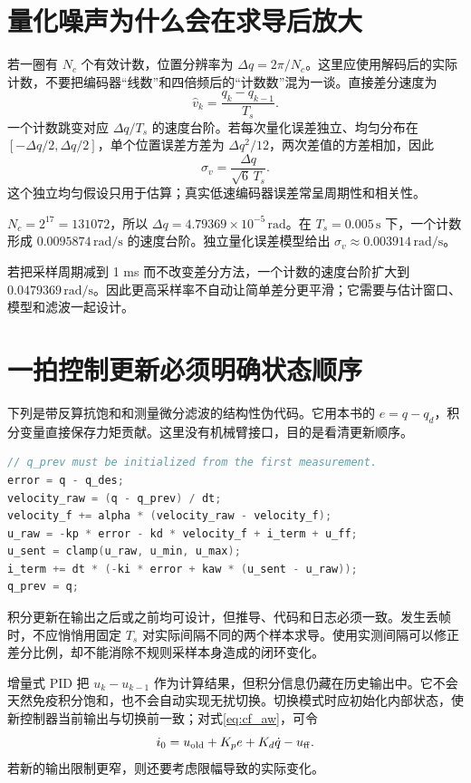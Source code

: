 \section{量化噪声为什么会在求导后放大}

若一圈有 $N_c$ 个有效计数，位置分辨率为 $\Delta q=2\pi/N_c$。这里应使用解码后的实际计数，不要把编码器“线数”和四倍频后的“计数数”混为一谈。直接差分速度为
\[
\hat v_k=\frac{q_k-q_{k-1}}{T_s}.
\]
一个计数跳变对应 $\Delta q/T_s$ 的速度台阶。若每次量化误差独立、均匀分布在 $[-\Delta q/2,\Delta q/2]$，单个位置误差方差为 $\Delta q^2/12$，两次差值的方差相加，因此
\[
\sigma_v=\frac{\Delta q}{\sqrt6\,T_s}.
\]
这个独立均匀假设只用于估算；真实低速编码器误差常呈周期性和相关性。

\begin{examplebox}
$N_c=2^{17}=131072$，所以 $\Delta q=4.79369\times10^{-5}\,\mathrm{rad}$。在 $T_s=0.005\,\mathrm{s}$ 下，一个计数形成 $0.0095874\,\mathrm{rad/s}$ 的速度台阶。独立量化误差模型给出 $\sigma_v\approx0.003914\,\mathrm{rad/s}$。

若把采样周期减到 1 ms 而不改变差分方法，一个计数的速度台阶扩大到 $0.0479369\,\mathrm{rad/s}$。因此更高采样率不自动让简单差分更平滑；它需要与估计窗口、模型和滤波一起设计。
\end{examplebox}

\section{一拍控制更新必须明确状态顺序}

下列是带反算抗饱和和测量微分滤波的结构性伪代码。它用本书的 $e=q-q_d$，积分变量直接保存力矩贡献。这里没有机械臂接口，目的是看清更新顺序。
\begin{lstlisting}[language=C++,basicstyle=\ttfamily\small]
// q_prev must be initialized from the first measurement.
error = q - q_des;
velocity_raw = (q - q_prev) / dt;
velocity_f += alpha * (velocity_raw - velocity_f);
u_raw = -kp * error - kd * velocity_f + i_term + u_ff;
u_sent = clamp(u_raw, u_min, u_max);
i_term += dt * (-ki * error + kaw * (u_sent - u_raw));
q_prev = q;
\end{lstlisting}

积分更新在输出之后或之前均可设计，但推导、代码和日志必须一致。发生丢帧时，不应悄悄用固定 $T_s$ 对实际间隔不同的两个样本求导。使用实测间隔可以修正差分比例，却不能消除不规则采样本身造成的闭环变化。

增量式 PID 把 $u_k-u_{k-1}$ 作为计算结果，但积分信息仍藏在历史输出中。它不会天然免疫积分饱和，也不会自动实现无扰切换。切换模式时应初始化内部状态，使新控制器当前输出与切换前一致；对式\eqref{eq:cf_aw}，可令
\[
i_0=u_{\rm old}+K_pe+K_d\dot q-u_{\rm ff}.
\]
若新的输出限制更窄，则还要考虑限幅导致的实际变化。

